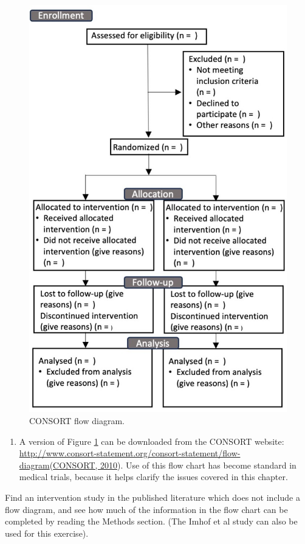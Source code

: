 \documentclass{krantz}
\providecommand{\tightlist}{%
\setlength{\itemsep}{0pt}\setlength{\parskip}{0pt}}
\begin{document}
\begin{figure}
\includegraphics[width=0.9\linewidth]{images_bw/consort} \caption{CONSORT flow diagram.}\label{fig:consortfig}
\end{figure}

\begin{enumerate}
\def\labelenumi{\arabic{enumi}.}
\setcounter{enumi}{1}
\tightlist
\item
  A version of Figure \ref{fig:consortfig} can be downloaded from the CONSORT website: \url{http://www.consort-statement.org/consort-statement/flow-diagram}(\protect\hyperlink{ref-consort2010} {CONSORT, 2010}). Use of this flow chart has become standard in medical trials, because it helps clarify the issues covered in this chapter.
\end{enumerate}

Find an intervention study in the published literature which does not include a flow diagram, and see how much of the information in the flow chart can be completed by reading the Methods section. (The Imhof et al study can also be used for this exercise).
\end{document}
